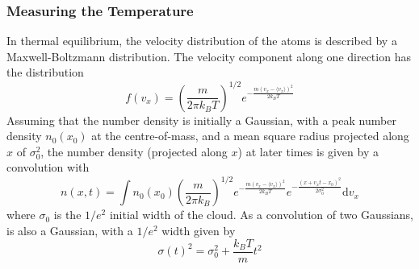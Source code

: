 \subsubsection{Measuring the Temperature}
In thermal equilibrium, the velocity distribution of the atoms is
described by a Maxwell-Boltzmann distribution. The velocity
component along one direction has the distribution
\begin{equation}
    f(v_x) = \left(\frac{m}{2\pi k_B T}\right)^{1/2}e^{-\frac{m (v_x-\langle v_x \rangle) ^2}{2 k_B T}}
    \label{eq:mb1D}
\end{equation}
Assuming that the number density is initially a Gaussian, with a peak
number density \(n_0(x_0)\) at the centre-of-mass,
and a mean square radius projected along $x$ of $\sigma_0^2$, the
number density (projected along $x$)
at later times is given by a convolution with~
\begin{equation}
        n(x,t) = \int n_0(x_0) \left(\frac{m}{2\pi k_B}\right)^{1/2} e^{-\frac{m (v_x-\langle v_x \rangle)^2}{2 k_B T}} e^{-\frac{(x+v_x t - x_0)^2}{2\sigma_0^2}} \mathrm{d}v_x
        \label{eq:density_time}
\end{equation}
where \(\sigma_0\) is the \(1/e^2\) initial width of the cloud. As a
convolution of two Gaussians,  is also a
Gaussian, with a \(1/e^2\) width given by
\begin{equation}
    \sigma(t)^2 = \sigma_0^2 + \frac{k_B T}{m} t^2
    \label{eq:expansion_width}
\end{equation}
